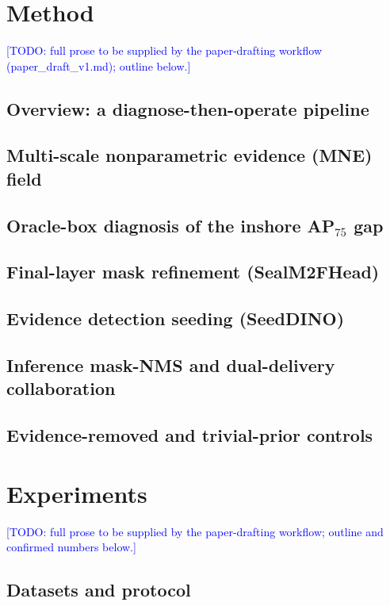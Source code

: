 \documentclass[journal]{IEEEtran}
\newcommand{\TODO}[1]{\textcolor{blue}{[TODO: #1]}}
\begin{document}
\section{Method}
\TODO{full prose to be supplied by the paper-drafting workflow (paper\_draft\_v1.md); outline below.}
\subsection{Overview: a diagnose-then-operate pipeline}
\subsection{Multi-scale nonparametric evidence (MNE) field}
\subsection{Oracle-box diagnosis of the inshore AP$_{75}$ gap}
\subsection{Final-layer mask refinement (SealM2FHead)}
\subsection{Evidence detection seeding (SeedDINO)}
\subsection{Inference mask-NMS and dual-delivery collaboration}
\subsection{Evidence-removed and trivial-prior controls}

\section{Experiments}
\TODO{full prose to be supplied by the paper-drafting workflow; outline and confirmed numbers below.}
\subsection{Datasets and protocol}
\end{document}
